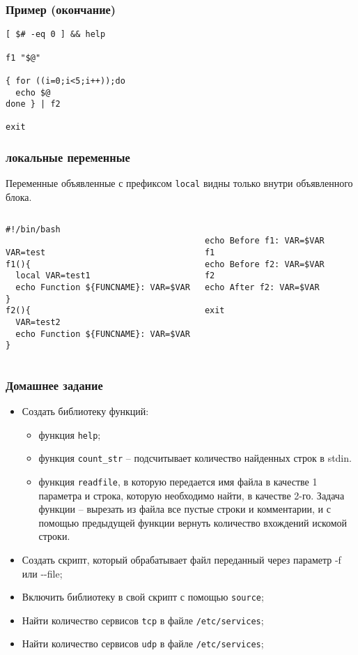 \begin{frame}[fragile]
	\frametitle{Пример (окончание)}
	\small
	\begin{lstlisting}
[ $# -eq 0 ] && help

f1 "$@"

{ for ((i=0;i<5;i++));do
  echo $@
done } | f2

exit
\end{lstlisting}

\end{frame}

\begin{frame}[fragile]
	\frametitle{локальные переменные}

	Переменные объявленные с префиксом {\tt local} видны только внутри объявленного блока.

	\small
	\begin{columns}
		\begin{lstlisting}
#!/bin/bash

VAR=test
f1(){
  local VAR=test1
  echo Function ${FUNCNAME}: VAR=$VAR
}
f2(){
  VAR=test2
  echo Function ${FUNCNAME}: VAR=$VAR
}
		\end{lstlisting}
		\begin{lstlisting}

echo Before f1: VAR=$VAR
f1
echo Before f2: VAR=$VAR
f2
echo After f2: VAR=$VAR

exit
\end{lstlisting}
	\end{columns}

\end{frame}

\begin{frame}
	\frametitle{Домашнее задание}
	\begin{itemize}
		\item Создать библиотеку функций:
			\begin{itemize}
				\item функция {\tt help};
				\item функция {\tt count\_str} -- подсчитывает количество найденных строк в stdin.
				\item функция {\tt readfile}, в которую передается имя файла в качестве 1 параметра
					и строка, которую необходимо найти, в качестве 2-го.
					Задача функции -- вырезать из файла все пустые строки и комментарии, 
					и с помощью предыдущей функции вернуть количество вхождений искомой строки.
			\end{itemize}
		\item Создать скрипт, который обрабатывает файл переданный через параметр -f или -{}-file;
		\item Включить библиотеку в свой скрипт с помощью {\tt source};
		\item Найти количество сервисов {\tt tcp} в файле {\tt /etc/services};
		\item Найти количество сервисов {\tt udp} в файле {\tt /etc/services};
  \end{itemize}
\end{frame}

